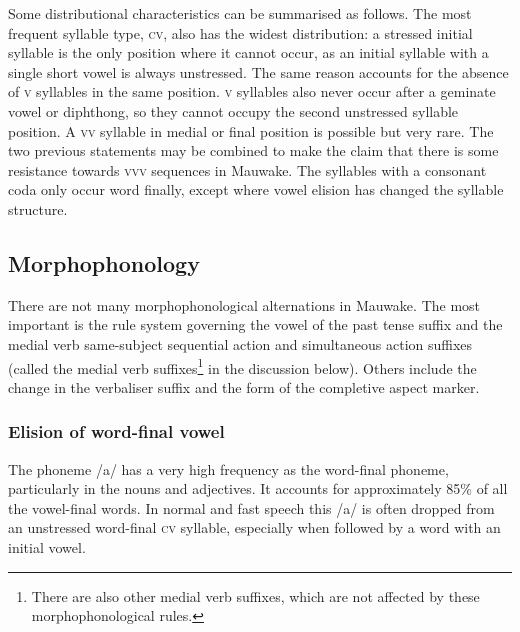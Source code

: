 





Some distributional characteristics can be summarised as follows.  The most frequent syllable type, \textsc{cv}, also has the widest distribution: a stressed initial syllable is the only position where it cannot occur, as an initial syllable with a single short vowel is always unstressed. The same reason accounts for the absence of \textsc{v} syllables in the same position. \textsc{v} syllables also never occur after a geminate vowel or diphthong, so they cannot occupy the second unstressed syllable position. A \textsc{vv} syllable in medial or final position is possible but very rare. The two previous statements may be combined to make the claim that there is some resistance towards \textsc{vvv} sequences in Mauwake. The syllables with a consonant coda only occur word finally, except where vowel elision has changed the syllable structure.  

\subsection{Morphophonology}\label{sec:2.3.3}

There are not many morphophonological alternations in Mauwake.  The most important is the rule system governing the vowel of the past tense suffix and the medial verb same-subject sequential action and simultaneous action suffixes (called the medial verb suffixes\footnote{There are also other medial verb suffixes, which are not  affected by these morphophonological rules.} in the discussion below).  Others include the change in the verbaliser suffix and the form of the completive aspect marker.

\subsubsection{Elision of word-final vowel}\label{sec:2:z:y:x}

The phoneme /a/ has a very high frequency as the word-final phoneme, particularly in the nouns and adjectives.  It accounts for approximately 85\% of all the vowel-final words.  In normal and fast speech this /a/ is often dropped from an unstressed word-final \textsc{cv} syllable, especially when followed by a word with an initial vowel. 

